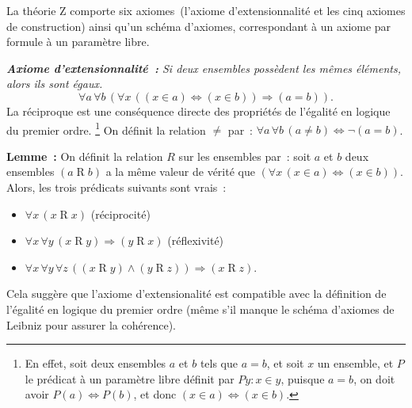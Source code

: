 La théorie Z comporte six axiomes (l'axiome d'extensionnalité et les cinq axiomes de construction) ainsi qu'un schéma d'axiomes, correspondant à un axiome par formule à un paramètre libre. 

\medskip

\noindent\textit{\textbf{Axiome d'extensionnalité :} Si deux ensembles possèdent les mêmes éléments, alors ils sont égaux.}
\begin{equation*}
    \forall a \, \forall b \, (
        \forall x \, ((x \in a) \Leftrightarrow (x \in b)) \Rightarrow (a = b)
    ). 
\end{equation*}
La réciproque est une conséquence directe des propriétés de l'égalité en logique du premier ordre.%
\footnote{ En effet, soit deux ensembles $a$ et $b$ tels que $a = b$, et soit $x$ un ensemble, et $P$ le prédicat à un paramètre libre définit par $P y: x \in y$, puisque $a = b$, on doit avoir $P(a) \Leftrightarrow P(b)$, et donc $(x \in a) \Leftrightarrow (x \in b)$.}
On définit la relation $\neq$ par : $\forall a \, \forall b \, (a \neq b) \Leftrightarrow \neg (a = b)$.

\medskip

\noindent\textbf{Lemme :} 
    On définit la relation $R$ sur les ensembles par : soit $a$ et $b$ deux ensembles $(a \mathrel{R} b)$ a la même valeur de vérité que $(\forall x \, (x \in a) \Leftrightarrow (x \in b))$. 
    Alors, les trois prédicats suivants sont vrais :
    \begin{itemize}[nosep]
        \item $\forall x \, (x \mathrel{R} x)$ (réciprocité)
        \item $\forall x \, \forall y \, (x \mathrel{R} y) \Rightarrow (y \mathrel{R} x)$ (réflexivité)
        \item $\forall x \, \forall y \, \forall z \, ((x \mathrel{R} y) \wedge (y \mathrel{R} z)) \Rightarrow (x \mathrel{R} z)$.
    \end{itemize}
    Cela suggère que l'axiome d'extensionalité est compatible avec la définition de l'égalité en logique du premier ordre (même s'il manque le schéma d'axiomes de Leibniz pour assurer la cohérence).

\medskip

